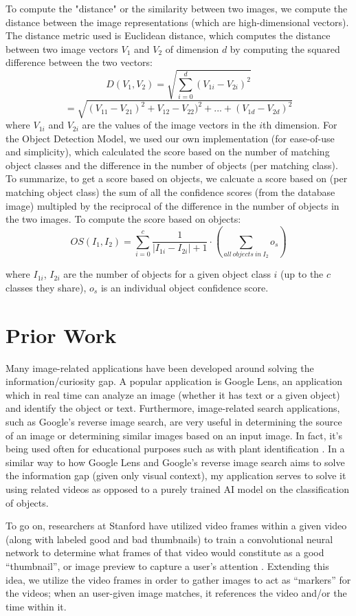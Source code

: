 \documentclass[10pt,twocolumn]{article}
\begin{document}
To compute the "distance" or the similarity between two images, we compute the distance between the image representations (which are high-dimensional vectors). The distance metric used is Euclidean distance, which computes the distance between two image vectors $V_1$ and $V_2$ of dimension $d$ by computing the squared difference between the two vectors: $$D(V_1, V_2) = \sqrt{\sum_{i=0}^{d} (V_{1i} - V_{2i})^2}$$
$$ = \sqrt{(V_{11} - V_{21})^2 + V_{12} - V_{22})^2 + ... + (V_{1d} - V_{2d})^2 }$$ where $V_{1i}$ and $V_{2i}$ are the values of the image vectors in the $i$th dimension. For the Object Detection Model, we used our own implementation (for ease-of-use and simplicity), which calculated the score based on the number of matching object classes and the difference in the number of objects (per matching class). To summarize, to get a score based on objects, we calcuate a score based on (per matching object class) the sum of all the confidence scores (from the database image) multipled by the reciprocal of the difference in the number of objects in the two images. To compute the score based on objects: $$OS(I_1, I_2) = \sum_{i = 0}^{c} \frac{1}{|I_{1i} - I_{2i}| + 1} \cdot (\sum_{all \ objects \ in \ I_{2}} o_s)$$

where $I_{1i}$, $I_{2i}$ are the number of objects for a given object class $i$ (up to the $c$ classes they share), $o_s$ is an individual object confidence score. 

\section{Prior Work}

Many image-related applications have been developed around solving the information/curiosity gap. A popular application is Google Lens, an application which in real time can analyze an image (whether it has text or a given object) and identify the object or text. Furthermore, image-related search applications, such as Google’s reverse image search, are very useful in determining the source of an image or determining similar images based on an input image. In fact, it’s being used often for educational purposes such as with plant identification \cite{Moore2018}. In a similar way to how Google Lens and Google’s reverse image search aims to solve the information gap (given only visual context), my application serves to solve it using related videos as opposed to a purely trained AI model on the classification of objects.

To go on, researchers at Stanford have utilized video frames within a given video (along with labeled good and bad thumbnails) to train a convolutional neural network to determine what frames of that video would constitute as a good “thumbnail”, or image preview to capture a user’s attention \cite{Stanford2017}. Extending this idea, we utilize the video frames in order to gather images to act as “markers” for the videos; when an user-given image matches, it references the video and/or the time within it.
\end{document}
